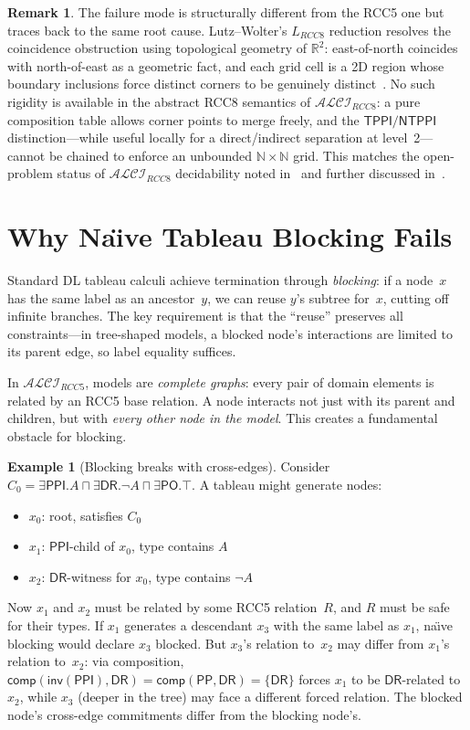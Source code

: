 \documentclass[
]{ceurart}
\theoremstyle{definition}
\newtheorem{examplex}[theorem]{Example}
\newtheorem{remark}[theorem]{Remark}
\newcommand{\ALCIRCC}[1]{\ensuremath{\mathcal{ALCI}_{\mathit{RCC#1}}}}
\newcommand{\LRCC}[1]{\ensuremath{L_{\mathit{RCC#1}}}}
\newcommand{\DR}{\ensuremath{\mathsf{DR}}}
\newcommand{\PO}{\ensuremath{\mathsf{PO}}}
\newcommand{\PP}{\ensuremath{\mathsf{PP}}}
\newcommand{\PPI}{\ensuremath{\mathsf{PPI}}}
\newcommand{\TPPI}{\ensuremath{\mathsf{TPPI}}}
\newcommand{\NTPPI}{\ensuremath{\mathsf{NTPPI}}}
\newcommand{\inv}{\ensuremath{\mathsf{inv}}}
\newcommand{\comp}{\ensuremath{\mathsf{comp}}}
\newcommand{\naturals}{\mathbb{N}}
\newcommand{\reals}{\mathbb{R}}
\begin{document}
\begin{remark}
The failure mode is structurally different from the RCC5 one but
traces back to the same root cause.  Lutz--Wolter's $\LRCC{8}$
reduction resolves the coincidence obstruction using topological
geometry of $\reals^2$: east-of-north coincides with north-of-east
as a geometric fact, and each grid cell is a 2D region whose
boundary inclusions force distinct corners to be genuinely
distinct~\cite{LutzWolter2006}.  No such rigidity is available in
the abstract RCC8 semantics of $\ALCIRCC{8}$: a pure composition
table allows corner points to merge freely, and the $\TPPI/\NTPPI$
distinction---while useful locally for a direct/indirect
separation at level~2---cannot be chained to enforce an unbounded
$\naturals \times \naturals$ grid.  This matches the open-problem
status of $\ALCIRCC{8}$ decidability noted in~\cite{LutzWolter2006}
and further discussed in~\cite{Wessel2003}.
\end{remark}

\section{Why Na\"{\i}ve Tableau Blocking Fails}
\label{sec:naive-blocking}

Standard DL tableau calculi achieve termination through
\emph{blocking}: if a node~$x$ has the same label as an ancestor~$y$,
we can reuse $y$'s subtree for~$x$, cutting off infinite
branches.  The key requirement is that the ``reuse'' preserves
all constraints---in tree-shaped models, a blocked node's
interactions are limited to its parent edge, so label equality suffices.

In $\ALCIRCC{5}$, models are \emph{complete graphs}: every pair
of domain elements is related by an RCC5 base relation.
A node interacts not just with its parent and children, but with
\emph{every other node in the model}.
This creates a fundamental obstacle for blocking.

\begin{examplex}[Blocking breaks with cross-edges]
\label{ex:blocking-fail}
Consider $C_0 = \exists\PPI.A \sqcap \exists\DR.\neg A
\sqcap \exists\PO.\top$.
A tableau might generate nodes:
\begin{itemize}[nosep]
  \item $x_0$: root, satisfies $C_0$
  \item $x_1$: $\PPI$-child of $x_0$, type contains $A$
  \item $x_2$: $\DR$-witness for $x_0$, type contains $\neg A$
\end{itemize}
Now $x_1$ and $x_2$ must be related by some RCC5 relation~$R$,
and $R$ must be safe for their types.  If $x_1$ generates a
descendant $x_3$ with the same label as $x_1$, na\"{\i}ve blocking
would declare $x_3$ blocked.  But $x_3$'s relation to~$x_2$ may
differ from $x_1$'s relation to~$x_2$: via composition,
$\comp(\inv(\PPI), \DR) = \comp(\PP, \DR) = \{\DR\}$ forces
$x_1$ to be $\DR$-related to~$x_2$, while $x_3$ (deeper in the
tree) may face a different forced relation.  The blocked node's
cross-edge commitments differ from the blocking node's.
\end{examplex}
\end{document}
